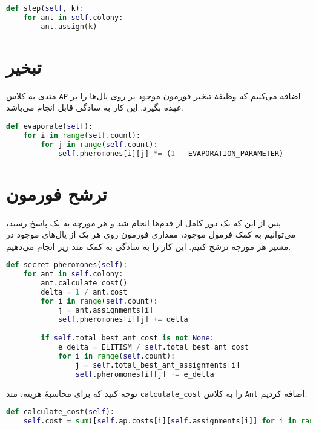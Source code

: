 \documentclass[a4paper, 12pt]{article}
\theoremstyle{definition}
\begin{document}
\LTR
\begin{lstlisting}[language=Python]
def step(self, k):
    for ant in self.colony:
        ant.assign(k)
\end{lstlisting}
\RTL

\section{تبخیر}

متدی به کلاس
\texttt{AP}
اضافه می‌کنیم که وظیفهٔ تبخیر فورمون موجود بر روی یال‌ها را بر عهده بگیرد. این کار به سادگی قابل انجام می‌باشد.

\LTR
\begin{lstlisting}[language=Python]
def evaporate(self):
    for i in range(self.count):
        for j in range(self.count):
            self.pheromones[i][j] *= (1 - EVAPORATION_PARAMETER)
\end{lstlisting}
\RTL

\section{ترشح فورمون}

پس از این که یک دور کامل از قدم‌ها انجام شد و هر مورچه به یک پاسخ رسید، می‌توانیم به کمک فرمول موجود، مقداری فورمون روی هر یک از یال‌های موجود در مسیر هر مورچه ترشح کنیم. این کار را به سادگی به کمک متد زیر انجام می‌دهیم.

\LTR
\begin{lstlisting}[language=Python]
def secret_pheromones(self):
    for ant in self.colony:
        ant.calculate_cost()
        delta = 1 / ant.cost
        for i in range(self.count):
            j = ant.assignments[i]
            self.pheromones[i][j] += delta

        if self.total_best_ant_cost is not None:
            e_delta = ELITISM / self.total_best_ant_cost
            for i in range(self.count):
                j = self.total_best_ant_assignments[i]
                self.pheromones[i][j] += e_delta
\end{lstlisting}
\RTL

توجه کنید که برای محاسبهٔ هزینه، متد
\texttt{calculate\_cost}
را به کلاس
\texttt{Ant}
اضافه کردیم.

\LTR
\begin{lstlisting}[language=Python]
def calculate_cost(self):
    self.cost = sum([self.ap.costs[i][self.assignments[i]] for i in range(self.ap.count)])
\end{lstlisting}
\RTL
\end{document}
